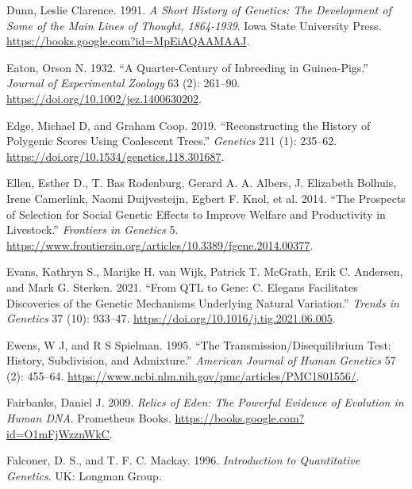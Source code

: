 \documentclass[
]{book}
\newlength{\cslhangindent}
\newlength{\cslentryspacingunit} %
\newenvironment{CSLReferences}[2] %
 {%
  \setlength{\parindent}{0pt}
  \ifodd #1
  \let\oldpar\par
  \def\par{\hangindent=\cslhangindent\oldpar}
  \fi
  \setlength{\parskip}{#2\cslentryspacingunit}
 }%
 {}
\begin{document}
\begin{CSLReferences}{1}{0}
\leavevmode{}%
Dunn, Leslie Clarence. 1991. \emph{A {Short History} of {Genetics}: {The Development} of {Some} of the {Main Lines} of {Thought}, 1864-1939}. {Iowa State University Press}. \url{https://books.google.com?id=MpEiAQAAMAAJ}.

\leavevmode{}%
Eaton, Orson N. 1932. {``A Quarter-Century of Inbreeding in Guinea-Pigs.''} \emph{Journal of Experimental Zoology} 63 (2): 261--90. \url{https://doi.org/10.1002/jez.1400630202}.

\leavevmode{}%
Edge, Michael D, and Graham Coop. 2019. {``Reconstructing the {History} of {Polygenic Scores Using Coalescent Trees}.''} \emph{Genetics} 211 (1): 235--62. \url{https://doi.org/10.1534/genetics.118.301687}.

\leavevmode{}%
Ellen, Esther D., T. Bas Rodenburg, Gerard A. A. Albers, J. Elizabeth Bolhuis, Irene Camerlink, Naomi Duijvesteijn, Egbert F. Knol, et al. 2014. {``The Prospects of Selection for Social Genetic Effects to Improve Welfare and Productivity in Livestock.''} \emph{Frontiers in Genetics} 5. \url{https://www.frontiersin.org/articles/10.3389/fgene.2014.00377}.

\leavevmode{}%
Evans, Kathryn S., Marijke H. van Wijk, Patrick T. McGrath, Erik C. Andersen, and Mark G. Sterken. 2021. {``From {QTL} to Gene: {C}. Elegans Facilitates Discoveries of the Genetic Mechanisms Underlying Natural Variation.''} \emph{Trends in Genetics} 37 (10): 933--47. \url{https://doi.org/10.1016/j.tig.2021.06.005}.

\leavevmode{}%
Ewens, W J, and R S Spielman. 1995. {``The Transmission/Disequilibrium Test: History, Subdivision, and Admixture.''} \emph{American Journal of Human Genetics} 57 (2): 455--64. \url{https://www.ncbi.nlm.nih.gov/pmc/articles/PMC1801556/}.

\leavevmode{}%
Fairbanks, Daniel J. 2009. \emph{Relics of {Eden}: {The Powerful Evidence} of {Evolution} in {Human DNA}}. {Prometheus Books}. \url{https://books.google.com?id=O1mFjWzznWkC}.

\leavevmode{}%
Falconer, D. S., and T. F. C. Mackay. 1996. \emph{Introduction to Quantitative Genetics}. {UK: Longman Group}.


\end{CSLReferences}
\end{document}
